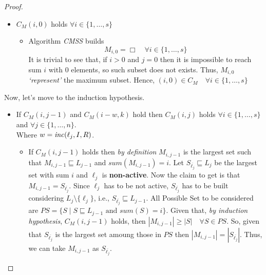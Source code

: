 \begin{proof}
\begin{itemize}
\begin{itemize}
    \end{itemize}
    \item $C_M(i,0)$ holds $\forall i \in \{1, \hdots, s\}$
    \begin{itemize}
        \item Algorithm \textit{CMSS} builds 
        $$M_{i,0} = \Box \quad \forall i \in \{1, \hdots , s\}$$
        It is trivial to see that, if $i > 0$ and $j = 0$ then it is impossible 
        to reach sum $i$ with $0$ elements, so such subset does not exists.
        Thus, $M_{i,0}$ \textit{`represent'} the maximum subset.
        Hence, $(i,0) \in C_M \quad \forall i \in \{1, \hdots, s\}$ 
    \end{itemize}
   \end{itemize}
   Now, let's move to the induction hypothesis.
   \begin{itemize}
    \item If $C_M(i,j-1)$ and $C_M(i-w,k)$ hold then $C_M(i,j)$ holds $\forall i \in \{1,\hdots,s\}$
    and $\forall j \in \{1, \hdots, n\}$.
    \\ Where $w = \mathit{inc}(\ell_j,I,R)$.
    \begin{itemize}
        \item If $C_M(i,j-1)$ holds then \textit{by definition} $M_{i,j-1}$ is the largest set 
            such that $M_{i,j-1} \sqsubseteq L_{j-1}$ and $\mathit{sum}(M_{i,j-1}) = i$.
            Let $S_{\overline{\ell_j}} \sqsubseteq L_j$ be the largest set with sum $i$
            and $\ell_j$ is \textbf{non-active}.
            Now the claim to get is that $M_{i,j-1} = S_{\overline{\ell_j}}$.
            Since $\ell_j$ has to be not active, $S_{\overline{\ell_j}}$ has to be built considering $L_j \setminus \{\ell_j\}$,
            i.e., $S_{\overline{\ell_j}} \sqsubseteq L_{j-1}$.
            All Possible Set to be considered are $PS = \{S \mid S \sqsubseteq L_{j-1} \text{ and } \mathit{sum}(S) = i\}$.
            Given that, \textit{by induction hypothesis}, $C_M(i,j-1)$ holds, then $|M_{i,j-1}| \ge |S| \quad \forall S \in PS$.
            So, given that $S_{\overline{\ell_j}}$ is the largest set amoung those in $PS$ then 
            $|M_{i,j-1}| =|S_{\overline{\ell_j}}|$.
            Thus, we can take $M_{i,j-1}$ as $S_{\overline{\ell_j}}$.\\


\end{itemize}
\end{itemize}
\end{proof}
